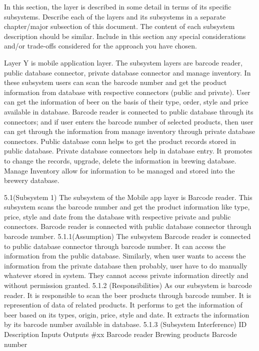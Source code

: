 In this section, the layer is described in some detail in terms of its specific subsystems. Describe each of the layers and its subsystems in a separate chapter/major subsection of this document. The content of each subsystem description should be similar. Include in this section any special considerations and/or trade-offs considered for the approach you have chosen.

Layer Y is mobile application layer. The subsystem layers are barcode reader, public database connector, private database connector and manage inventory. In these subsystem users can scan the barcode number and get the product information from database with respective connectors (public and private). User can get the information of beer on the basis of their type, order, style and price available in database.  Barcode reader is connected to public database through its connectors; and if user enters the barcode number of selected products, then user can get through the information from manage inventory through private database connectors. Public database conn helps to get the product records stored in public database. Private database connectors help in database entry. It promotes to change the records, upgrade, delete the information in brewing database. Manage Inventory allow for information to be managed and stored into the brewery database.

5.1(Subsystem 1)
The subsystem of the Mobile app layer is Barcode reader. This subsystem scans the barcode number and get the product information like type, price, style and date from the database with respective private and public connectors. Barcode reader is connected with public database connector through barcode number. 
5.1.1(Assumption)
The subsystem Barcode reader is connected to public database connector through barcode number. It can access the information from the public database. Similarly, when user wants to access the information from the private database then probably, user have to do manually whatever stored in system. They cannot access private information directly and without permission granted.
5.1.2
(Responsibilities)
As our subsystem is barcode reader. It is responsible to scan the beer products through barcode number. It is represention of data of related products. It performs to get the information of beer based on its types, origin, price, style and date. It extracts the information by its barcode number available in database.
 5.1.3 (Subsystem Interference)
ID 	Description 	Inputs 	                  Outputs 
#xx 	Barcode reader	 Brewing products	Barcode number 



